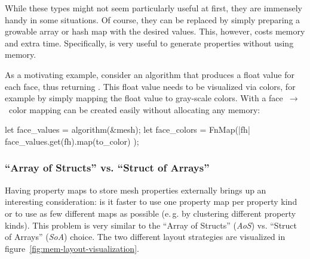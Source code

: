While these types might not seem particularly useful at first, they are immensely handy in some situations.
Of course, they can be replaced by simply preparing a growable array or hash map with the desired values.
This, however, costs memory and extra time.
Specifically,  is very useful to generate properties without using memory.

As a motivating example, consider an algorithm that produces a float value for each face, thus returning .
This float value needs to be visualized via colors, for example by simply mapping the float value to gray-scale colors.
With  a face~$\rightarrow$~color mapping can be created easily without allocating any memory:

\begin{center}
  \begin{minipage}{.59\textwidth}
    \begin{rustcode}
      let face_values = algorithm(&mesh);
      let face_colors = FnMap(|fh| {
          face_values.get(fh).map(to_color)
      });
    \end{rustcode}
  \end{minipage}
\end{center}


\subsubsection*{\enquote{Array of Structs} vs. \enquote{Struct of Arrays}}

Having property maps to store mesh properties externally brings up an interesting consideration: is it faster to use one property map per property kind or to use as few different maps as possible (e.\,g. by clustering different property kinds).
This problem is very similar to the \enquote{Array of Structs} (\emph{AoS}) vs. \enquote{Struct of Arrays} (\emph{SoA}) choice.
The two different layout strategies are visualized in figure~\ref{fig:mem-layout-visualization}.

